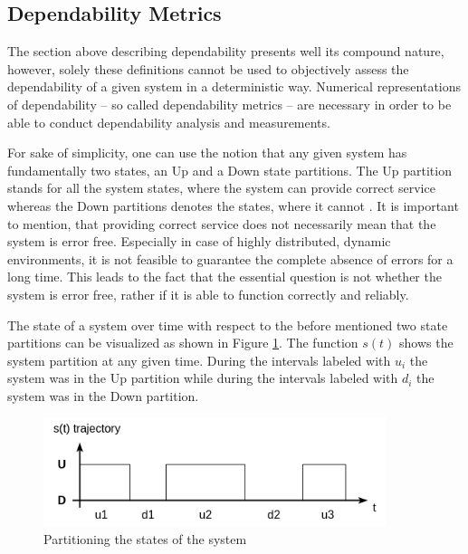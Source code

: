 \subsection{Dependability Metrics}

The section above describing dependability presents well its compound nature, however, solely these definitions cannot be used to objectively assess the dependability of a given system in a deterministic way. Numerical representations of dependability -- so called dependability metrics -- are necessary in order to be able to conduct dependability analysis and measurements.

For sake of simplicity, one can use the notion that any given system has fundamentally two states, an Up and a Down state partitions. The Up partition stands for all the system states, where the system can provide correct service whereas the Down partitions denotes the states, where it cannot \cite{DependabilityBMEMIT}. It is important to mention, that providing correct service does not necessarily mean that the system is error free. Especially in case of highly distributed, dynamic environments, it is not feasible to guarantee the complete absence of errors for a long time. This leads to the fact that the essential question is not whether the system is error free, rather if it is able to function correctly and reliably.

The state of a system over time with respect to the before mentioned two state partitions can be visualized as shown in Figure \ref{fig:system_state_partitions}. The function \(s(t)\) shows the system partition at any given time. During the intervals labeled with \(u_i\) the system was in the Up partition while during the intervals labeled with \(d_i\) the system was in the Down partition.


\begin{figure}[h]
	\centering
	\includegraphics[width=100mm, keepaspectratio]{figures/system_state_partitions.png}
	\caption{ Partitioning the states of the system \cite{DependabilityBMEMIT} }
	\label{fig:system_state_partitions}
\end{figure}

